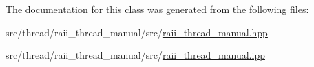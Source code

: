 The documentation for this class was generated from the following files\-:\begin{DoxyCompactItemize}
\item 
src/thread/raii\-\_\-thread\-\_\-manual/src/\hyperlink{raii__thread__manual_8hpp}{raii\-\_\-thread\-\_\-manual.\-hpp}\item 
src/thread/raii\-\_\-thread\-\_\-manual/src/\hyperlink{raii__thread__manual_8ipp}{raii\-\_\-thread\-\_\-manual.\-ipp}\end{DoxyCompactItemize}
